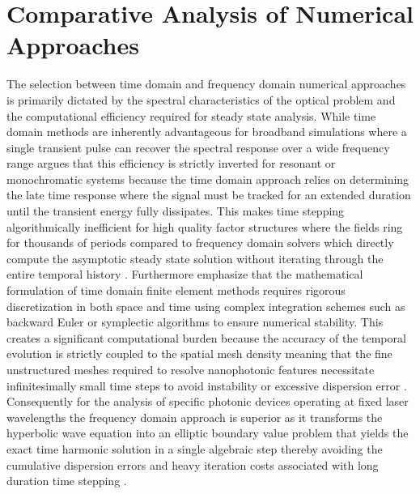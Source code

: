 \documentclass[class=report, crop=false]{standalone}
\begin{document}
\section{Comparative Analysis of Numerical Approaches}

The selection between time domain and frequency domain numerical approaches is primarily dictated by the spectral characteristics of the optical problem and the computational efficiency required for steady state analysis. While time domain methods are inherently advantageous for broadband simulations where a single transient pulse can recover the spectral response over a wide frequency range \citep{teixeira2023finite} \citet{Miller1994} argues that this efficiency is strictly inverted for resonant or monochromatic systems because the time domain approach relies on determining the late time response where the signal must be tracked for an extended duration until the transient energy fully dissipates. This makes time stepping algorithmically inefficient for high quality factor structures where the fields ring for thousands of periods compared to frequency domain solvers which directly compute the asymptotic steady state solution without iterating through the entire temporal history \citep{Miller1994}. Furthermore \citet{Anees2019} emphasize that the mathematical formulation of time domain finite element methods requires rigorous discretization in both space and time using complex integration schemes such as backward Euler or symplectic algorithms to ensure numerical stability. This creates a significant computational burden because the accuracy of the temporal evolution is strictly coupled to the spatial mesh density meaning that the fine unstructured meshes required to resolve nanophotonic features necessitate infinitesimally small time steps to avoid instability or excessive dispersion error \citep{Anees2019}. Consequently for the analysis of specific photonic devices operating at fixed laser wavelengths the frequency domain approach is superior as it transforms the hyperbolic wave equation into an elliptic boundary value problem that yields the exact time harmonic solution in a single algebraic step thereby avoiding the cumulative dispersion errors and heavy iteration costs associated with long duration time stepping \citep{Shin2012}.

\vspace{12pt}
\end{document}
